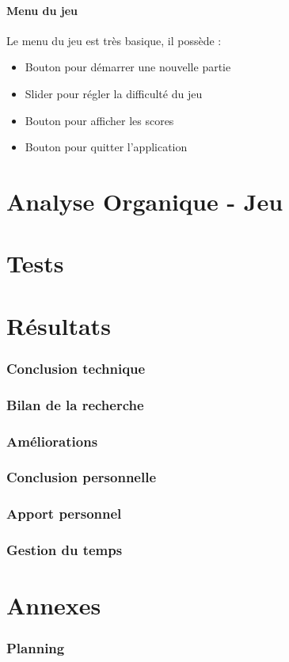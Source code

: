 \documentclass[11pt, a4paper, oneside]{article}
\begin{document}
\subsection{Menu du jeu}
Le menu du jeu est très basique, il possède :
\begin{itemize}
	\item Bouton pour démarrer une nouvelle partie
	\item Slider pour régler la difficulté du jeu
	\item Bouton pour afficher les scores
	\item Bouton pour quitter l'application
\end{itemize}
\newpage
\part{Analyse Organique - Jeu}
\newpage
\part{Tests}
\newpage
\part{Résultats} 
\section{Conclusion technique}
\section{Bilan de la recherche}
\section{Améliorations}
\section{Conclusion personnelle}
\section{Apport personnel}
\section{Gestion du temps}
\newpage
\part{Annexes}
\section{Planning}
\end{document}
